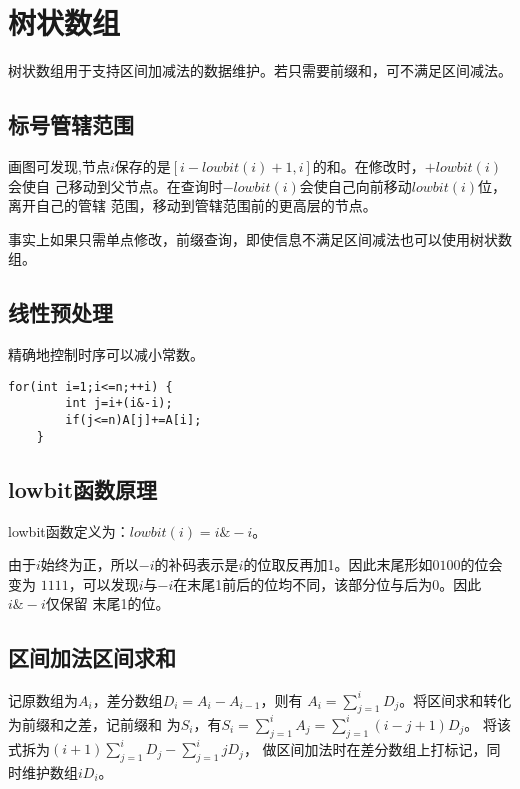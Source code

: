 \section{树状数组}
树状数组用于支持区间加减法的数据维护。若只需要前缀和，可不满足区间减法。
\subsection{标号管辖范围}

画图可发现,节点$i$保存的是$[i-lowbit(i)+1,i]$的和。在修改时，$+lowbit(i)$会使自
己移动到父节点。在查询时$-lowbit(i)$会使自己向前移动$lowbit(i)$位，离开自己的管辖
范围，移动到管辖范围前的更高层的节点。

事实上如果只需单点修改，前缀查询，即使信息不满足区间减法也可以使用树状数组。
\subsection{线性预处理}
精确地控制时序可以减小常数。

\begin{lstlisting}[title=LinearBuild]
    for(int i=1;i<=n;++i) {
        int j=i+(i&-i);
        if(j<=n)A[j]+=A[i];
    }
\end{lstlisting}

\subsection{lowbit函数原理}

lowbit函数定义为：$lowbit(i)=i\&-i$。

由于$i$始终为正，所以$-i$的补码表示是$i$的位取反再加1。因此末尾形如$0100$的位会变为
$1111$，可以发现$i$与$-i$在末尾1前后的位均不同，该部分位与后为0。因此$i\&-i$仅保留
末尾1的位。
\subsection{区间加法区间求和}
记原数组为$A_i$，差分数组$D_i=A_i-A_{i-1}$，则有
$\displaystyle A_i=\sum_{j=1}^i{D_j}$。将区间求和转化为前缀和之差，记前缀和
为$S_i$，有$\displaystyle S_i=\sum_{j=1}^i{A_j}=\sum_{j=1}^i{(i-j+1)D_j}$。
将该式拆为$\displaystyle (i+1)\sum_{j=1}^i{D_j}-\sum_{j=1}^i{jD_j}$，
做区间加法时在差分数组上打标记，同时维护数组$iD_i$。
